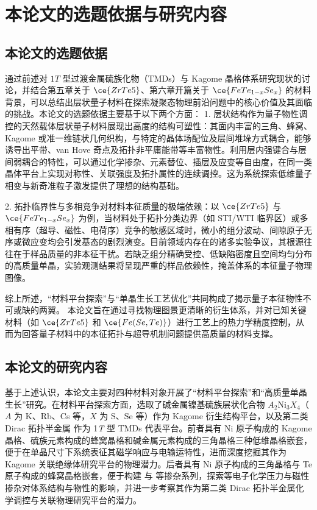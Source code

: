 \section{本论文的选题依据与研究内容}
\subsection{本论文的选题依据}
通过前述对 $1T$ 型过渡金属硫族化物（TMDs）与 Kagome 晶格体系研究现状的讨论，并结合第五章关于 $\ce{ZrTe5}$、第六章开篇关于 $\ce{FeTe_{1-x}Se_x}$ 的材料背景，可以总结出层状量子材料在探索凝聚态物理前沿问题中的核心价值及其面临的挑战。本论文的选题依据主要基于以下两个方面：
1. 层状结构作为量子物性调控的天然载体层状量子材料展现出高度的结构可塑性：其面内丰富的三角、蜂窝、Kagome 或准一维链状几何织构，与特定的晶体场配位及层间堆垛方式耦合，能够诱导出平带、van Hove 奇点及拓扑非平庸能带等丰富物性。利用层内强键合与层间弱耦合的特性，可以通过化学掺杂、元素替位、插层及应变等自由度，在同一类晶体平台上实现对称性、关联强度及拓扑属性的连续调控。这为系统探索低维量子相变与新奇准粒子激发提供了理想的结构基础。

2. 拓扑临界性与多相竞争对材料本征质量的极端依赖：以 $\ce{ZrTe5}$ 与 $\ce{FeTe_{1-x}Se_x}$ 为例，当材料处于拓扑分类边界（如 STI/WTI 临界区）或多相有序（超导、磁性、电荷序）竞争的敏感区域时，微小的组分波动、间隙原子无序或微应变均会引发基态的剧烈演变。目前领域内存在的诸多实验争议，其根源往往在于样品质量的非本征干扰。若缺乏组分精确受控、低缺陷密度且空间均匀分布的高质量单晶，实验观测结果将呈现严重的样品依赖性，掩盖体系的本征量子物理图像。

综上所述，“材料平台探索”与“单晶生长工艺优化”共同构成了揭示量子本征物性不可或缺的两翼。 本论文旨在通过寻找物理图景更清晰的衍生体系，并对已知关键材料（如 $\ce{ZrTe5}$ 和 $\ce{Fe(Se,Te)}$）进行工艺上的热力学精度控制，从而为回答量子材料中的本征拓扑与超导机制问题提供高质量的材料支撑。

\subsection{本论文的研究内容}
基于上述认识，本论文主要对四种材料对象开展了“材料平台探索”和“高质量单晶生长”研究。在材料平台探索方面，选取了碱金属镍基硫族层状化合物 $A_2\mathrm{Ni}_3X_4$（$A$ 为 K、Rb、Cs 等，$X$ 为 S、Se 等）作为 Kagome 衍生结构平台，以及第二类 Dirac 拓扑半金属  作为 1\textit{T} 型 TMDs 代表平台。前者具有 Ni 原子构成的 Kagome 晶格、硫族元素构成的蜂窝晶格和碱金属元素构成的三角晶格三种低维晶格嵌套，便于在单晶尺寸下系统表征其磁学响应与电输运特性，进而深度挖掘其作为 Kagome 关联绝缘体研究平台的物理潜力。后者具有 Ni 原子构成的三角晶格与 Te 原子构成的蜂窝晶格嵌套，便于构建  与  等掺杂系列，探索等电子化学压力与磁性掺杂对体系结构与物性的影响，并进一步考察其作为第二类 Dirac 拓扑半金属化学调控与关联物理研究平台的潜力。

